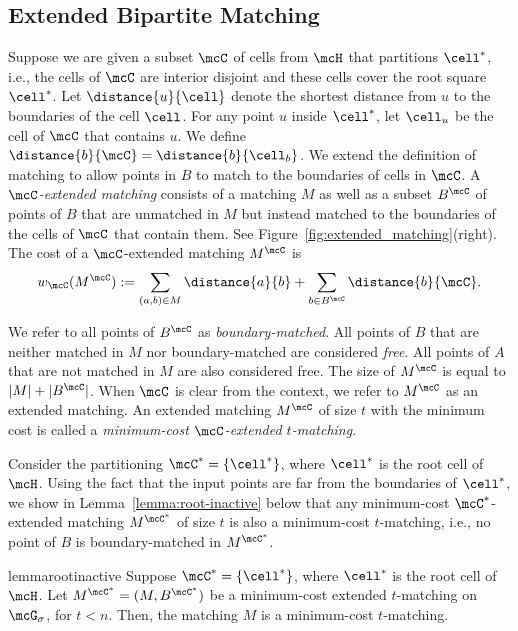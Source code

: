 \subsection{Extended Bipartite Matching}\label{sec:primal}
Suppose we are given a subset $\mcC$ of cells from $\mcH$ that partitions $\cell^*$, i.e., the cells of $\mcC$ are interior disjoint and these cells cover the root square $\cell^*$. Let $\distance{u}{\cell}$ denote the shortest distance from $u$ to the boundaries of the cell $\cell$. For any point $u$ inside $\cell^*$, let $\cell_u$ be the cell of $\mcC$ that contains $u$. We define $\distance{b}{\mcC} = \distance{b}{\cell_b}$. We extend the definition of matching to allow points in $B$ to match to the boundaries of cells in $\mcC$. A \emph{$\mcC$-extended matching} consists of a matching $M$ as well as a subset $B^\mcC$ of points of $B$ that are unmatched in $M$ but instead matched to the boundaries of the cells of $\mcC$ that contain them. See Figure~\ref{fig:extended_matching}(right). The cost of a $\mcC$-extended matching $M^\mcC$ is
\begin{equation}
    w_\mcC(M^\mcC) := \sum_{(a,b)\in M} \distance{a}{b} + \sum_{b \in B^{\mcC}} \distance{b}{\mcC}.
\end{equation}

We refer to all points of $B^{\mcC}$ as \emph{boundary-matched}. All points of $B$ that are neither matched in $M$ nor boundary-matched are considered \emph{free}. All points of $A$ that are not matched in $M$ are also considered free. The size of $M^{\mcC}$ is equal to $|M|+|B^{\mcC}|$. When $\mcC$ is clear from the context, we refer to $M^{\mcC}$ as an extended matching. An extended matching $M^{\mcC}$ of size $t$ with the minimum cost is called a \emph{minimum-cost $\mcC$-extended $t$-matching}.





Consider the partitioning $\mcC^*=\{\cell^*\}$, where $\cell^*$ is the root cell of $\mcH$. Using the fact that the input points are far from the boundaries of $\cell^*$, we show in Lemma~\ref{lemma:root-inactive} below that any minimum-cost $\mcC^*$-extended matching $M^{\mcC^*}$ of size $t$ is also a minimum-cost $t$-matching, i.e., no point of $B$ is boundary-matched in $M^{\mcC^*}$. 
\begin{restatable}{lemma}{rootinactive}\label{lemma:root-inactive}
    Suppose $\mcC^*=\{\cell^*\}$, where $\cell^*$ is the root cell of $\mcH$. Let $M^{\mcC^*}=(M, B^{\mcC^*})$ be a minimum-cost extended $t$-matching on $\mcG_\sigma$, for $t<n$. Then, the matching $M$ is a minimum-cost $t$-matching.
\end{restatable}


